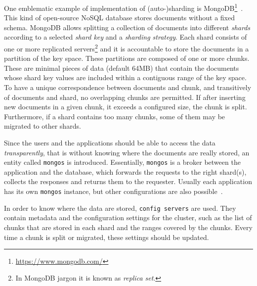 One emblematic example of implementation of (auto-)sharding is
MongoDB\footnote{\url{https://www.mongodb.com/}}~\cite{bib:mongodb}. This kind
of open-source NoSQL database stores documents without a fixed schema.
MongoDB allows splitting a collection of documents into different \emph{shards}
according to a selected \emph{shard key} and a \emph{sharding strategy}. Each
shard consists of one or more replicated servers\footnote{In MongoDB jargon it
is known as \emph{replica set}.} and it is accountable to store the documents in
a partition of the key space. These partitions are composed of one or more
chunks. These are minimal pieces of data (default 64MB) that contain the
documents whose shard key values are included within a contiguous range of the
key space. To have a unique correspondence between documents and chunk, and
transitively of documents and shard, no overlapping chunks are permitted. If
after inserting new documents in a given chunk, it exceeds a configured size,
the chunk is split. Furthermore, if a shard contains too many chunks, some of
them may be migrated to other shards.

Since the users and the applications should be able to access the data
\emph{transparently}, that is without knowing where the documents are really
stored, an entity called \texttt{mongos} is introduced. Essentially,
\texttt{mongos} is a broker between the application and the database, which
forwards the requests to the right shard(s), collects the responses and returns
them to the requester. Usually each application has its own \texttt{mongos}
instance, but other configurations are also possible~\cite{bib:mongodb}.

In order to know where the data are stored, \texttt{config servers} are
used. They contain metadata and the configuration settings for the cluster, such
as the list of chunks that are stored in each shard and the ranges covered by
the chunks. Every time a chunk is split or migrated, these settings should be
updated.

